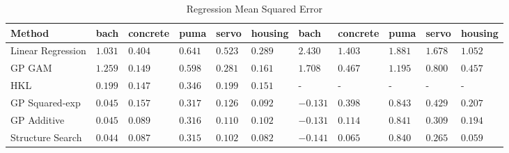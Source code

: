 \begin{table*}[ht!]
\caption{{\small
Regression Mean Squared Error
}}
\label{tbl:Regression Mean Squared Error}
\begin{center}
\begin{tabularx}{\textwidth}{l | XXXXX | XXXXX}
\small
 Method & bach  & concrete  & puma  &  servo & housing
& bach  & concrete  & puma  &  servo & housing
\\ \hline
Linear Regression 
& $1.031$ & $0.404$ & $0.641$ & $0.523$ & $0.289$ 
& $2.430$ & $1.403$ & $1.881$ & $1.678$ & $1.052$ \\
GP GAM 
& $1.259$ & $0.149$ & $0.598$ & $0.281$ & $0.161$ 
& $1.708$ & $0.467$ & $1.195$ & $0.800$ & $0.457$ \\
HKL 
& $\mathbf{0.199}$ & $0.147$ & $0.346$ & $0.199$ & $0.151$ 
& - & - & - & - & -\\
GP Squared-exp 
& $\mathbf{0.045}$ & $0.157$ & $0.317$ & $0.126$ & $\mathbf{0.092}$ 
& $\mathbf{-0.131}$ & $0.398$ & $0.843$ & $0.429$ & $0.207$ \\
GP Additive 
& $\mathbf{0.045}$ & $\mathbf{0.089}$ & $\mathbf{0.316}$ & $\mathbf{0.110}$ & $0.102$ 
& $\mathbf{-0.131}$ & $\mathbf{0.114}$ & $\mathbf{0.841}$ & $\mathbf{0.309}$ & $0.194$ \\
\hline
Structure Search 
& $\mathbf{0.044}$ & $\mathbf{0.087}$ & $\mathbf{0.315}$ & $\mathbf{0.102}$ & $\mathbf{0.082}$ 
& $\mathbf{-0.141}$ & $\mathbf{0.065}$ & $\mathbf{0.840}$ & $\mathbf{0.265}$ & $\mathbf{0.059}$
\end{tabularx}
\end{center}
\end{table*}
